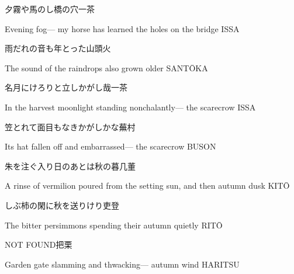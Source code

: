\begin{haiku}
    {\FH 夕霧や馬のし橋の穴}\hfill{\FH 一茶}

    \vin{} Evening fog---
    \vin{} \vin{} my horse has learned
    \vin{} \vin{} \vin{} the holes on the bridge \hspace{\fill} ISSA
\end{haiku}

\begin{haiku}
    {\FH 雨だれの音も年とった}\hfill{\FH 山頭火}

    \vin{} The sound
    \vin{} \vin{} of the raindrops
    \vin{} \vin{} \vin{} also grown older \hspace{\fill} SANT\={O}KA
\end{haiku}

\begin{haiku}
    {\FH 名月にけろりと立しかがし哉}\hfill{\FH 一茶}

    \vin{} In the harvest moonlight
    \vin{} \vin{} standing nonchalantly---
    \vin{} \vin{} \vin{} the scarecrow \hspace{\fill} ISSA
\end{haiku}

\begin{haiku}
    {\FH 笠とれて面目もなきかがしかな}\hfill{\FH 蕪村}

    \vin{} Its hat fallen off
    \vin{} \vin{} and embarrassed---
    \vin{} \vin{} \vin{} the scarecrow \hspace{\fill} BUSON
\end{haiku}

\begin{haiku}
    {\FH 朱を注ぐ入り日のあとは秋の暮}\hfill{\FH 几董}

    \vin{} A rinse of vermilion poured
    \vin{} \vin{} from the setting sun, and then
    \vin{} \vin{} \vin{} autumn dusk \hspace{\fill} KIT\=O
\end{haiku}

\begin{haiku}
    {\FH しぶ柿の閑に秋を送りけり}\hfill{\FH 吏登}

    \vin{} The bitter persimmons
    \vin{} \vin{} spending their autumn
    \vin{} \vin{} \vin{} quietly \hspace{\fill} RIT\={O}
\end{haiku}

\begin{haiku}
    NOT FOUND\hfill{\FH 把栗}

    \vin{} Garden gate
    \vin{} \vin{} slamming and thwacking---
    \vin{} \vin{} \vin{} autumn wind \hspace{\fill} HARITSU
\end{haiku}

